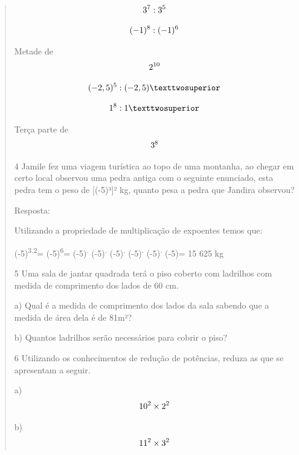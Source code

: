 \begin{quote}
\item $$3\textsuperscript{7}:3\textsuperscript{5}$$ 

\item $$(-1)\textsuperscript{8}:(-1)\textsuperscript{6}$$ 

\item Metade de $$2\textsuperscript{10}$$ 

\item $$(-2,5)\textsuperscript{5} : (-2,5)²$$ 

\item $$1\textsuperscript{8}:1²$$ 

\item Terça parte de $$3\textsuperscript{8}$$ 

\num{4} Jamile fez uma viagem turística ao topo de uma montanha, ao chegar em
certo local observou uma pedra antiga com o seguinte enunciado, esta
pedra tem o peso de {[}(-5)³{]}² kg, quanto pesa a pedra que Jandira
observou?


Resposta:

Utilizando a propriedade de multiplicação de expoentes temos que:

(-5)\textsuperscript{3.2}= (-5)\textsuperscript{6}=
(-5)\textsuperscript{.} (-5)\textsuperscript{.} (-5)\textsuperscript{.}
(-5)\textsuperscript{.} (-5)\textsuperscript{.} (-5)= 15 625 kg

\num{5} Uma sala de jantar quadrada terá o piso coberto com ladrilhos com
medida de comprimento dos lados de 60 cm.

a) Qual é a medida de comprimento dos lados da sala sabendo que a medida
de área dela é de 81m²?


b) Quantos ladrilhos serão necessários para cobrir o piso?


\num{6} Utilizando os conhecimentos de redução de potências, reduza as
que se apresentam a seguir.

a) $$10\textsuperscript{2}\times2\textsuperscript{2}$$ 

b) $$11\textsuperscript{2}\times3\textsuperscript{2}$$ 


\end{quote}
